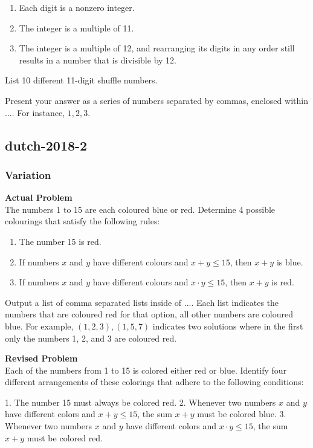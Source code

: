 \begin{enumerate}
\item Each digit is a nonzero integer.
\item The integer is a multiple of 11.
\item The integer is a multiple of 12, and rearranging its digits in any order still results in a number that is divisible by 12.
\end{enumerate}
List 10 different 11-digit shuffle numbers.

Present your answer as a series of numbers separated by commas, enclosed within $\boxed{...}$. For instance, $\boxed{1, 2, 3}$.

\subsection{dutch-2018-2}
\subsubsection{Variation}
\textbf{Actual Problem}\\
The numbers 1 to 15 are each coloured blue or red. Determine 4 possible colourings that satisfy the following rules:

\begin{enumerate}
\item The number 15 is red.
\item If numbers $x$ and $y$ have different colours and $x + y \leqslant 15$, then $x + y$ is blue.
\item If numbers $x$ and $y$ have different colours and $x \cdot y \leqslant 15$, then $x + y$ is red.
\end{enumerate}

Output a list of comma separated lists inside of $\boxed{...}$. Each list indicates the numbers that are coloured red for that option, all other numbers are coloured blue. For example, $\boxed{(1,2,3),(1,5,7)}$ indicates two solutions where in the first only the numbers 1, 2, and 3 are coloured red. 

\textbf{Revised Problem}\\
Each of the numbers from 1 to 15 is colored either red or blue. Identify four different arrangements of these colorings that adhere to the following conditions:

1. The number 15 must always be colored red.
2. Whenever two numbers $x$ and $y$ have different colors and $x + y \leq 15$, the sum $x + y$ must be colored blue.
3. Whenever two numbers $x$ and $y$ have different colors and $x \cdot y \leq 15$, the sum $x + y$ must be colored red.


